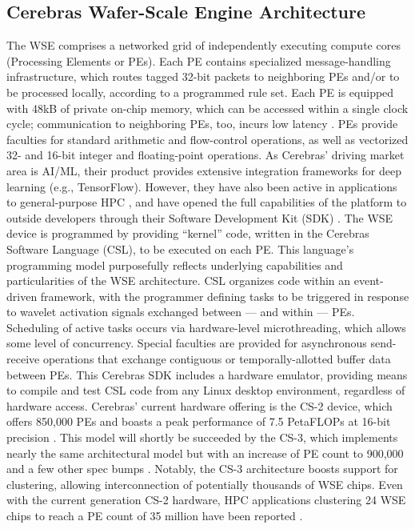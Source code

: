 \subsection{Cerebras Wafer-Scale Engine Architecture}

The WSE comprises a networked grid of independently executing compute cores (Processing Elements or PEs).
Each PE contains specialized message-handling infrastructure, which routes tagged 32-bit packets to neighboring PEs and/or to be processed locally, according to a programmed rule set.
Each PE is equipped with 48kB of private on-chip memory, which can be accessed within a single clock cycle;
communication to neighboring PEs, too, incurs low latency \citep{buitrago2021neocortex}.
PEs provide faculties for standard arithmetic and flow-control operations, as well as vectorized 32- and 16-bit integer and floating-point operations.
As Cerebras' driving market area is AI/ML, their product provides extensive integration frameworks for deep learning (e.g., TensorFlow).
However, they have also been active in applications to general-purpose HPC \citep{jacquelin2022scalable,rocki2020fast}, and have opened the full capabilities of the platform to outside developers through their Software Development Kit (SDK) \citep{selig2022cerebras}.
The WSE device is programmed by providing ``kernel'' code, written in the Cerebras Software Language (CSL), to be executed on each PE.
This language's programming model purposefully reflects underlying capabilities and particularities of the WSE architecture.
CSL organizes code within an event-driven framework, with the programmer defining tasks to be triggered in response to wavelet activation signals exchanged between --- and within --- PEs.
Scheduling of active tasks occurs via hardware-level microthreading, which allows some level of concurrency.
Special faculties are provided for asynchronous send-receive operations that exchange contiguous or temporally-allotted buffer data between PEs.
This Cerebras SDK includes a hardware emulator, providing means to compile and test CSL code from any Linux desktop environment, regardless of hardware access.
Cerebras' current hardware offering is the CS-2 device, which offers 850,000 PEs and boasts a peak performance of 7.5 PetaFLOPs at 16-bit precision \citep{lie2023cerebras}.
This model will shortly be succeeded by the CS-3, which implements nearly the same architectural model but with an increase of PE count to 900,000 and a few other spec bumps \citep{moore2024cerebras}.
Notably, the CS-3 architecture boosts support for clustering, allowing interconnection of potentially thousands of WSE chips.
Even with the current generation CS-2 hardware, HPC applications clustering 24 WSE chips to reach a PE count of 35 million have been reported \citep{ltaief2023scaling}.
